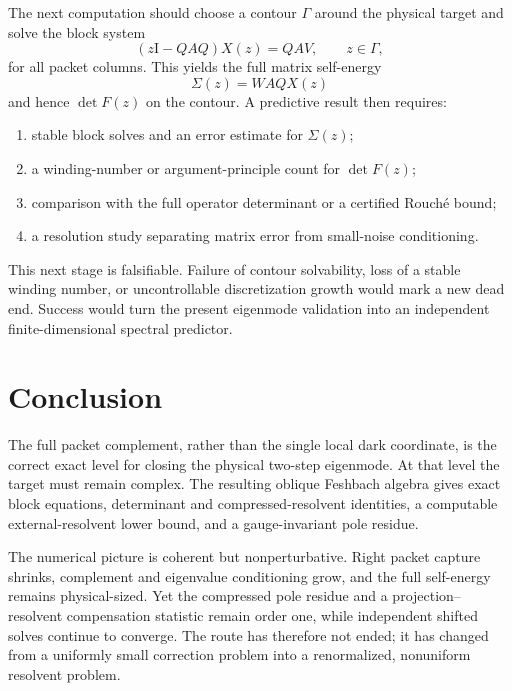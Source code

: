 \documentclass[11pt]{article}
\theoremstyle{definition}
\theoremstyle{remark}
\newcommand{\Id}{\mathrm I}
\begin{document}
The next computation should choose a contour $\Gamma$ around the physical
target and solve the block system
\begin{equation}
\label{eq:next-block-solve}
 (z\Id-QAQ)X(z)=QAV,
 \qquad z\in\Gamma,
\end{equation}
for all packet columns.  This yields the full matrix self-energy
\begin{equation}
\label{eq:next-self-energy}
 \Sigma(z)=WAQX(z)
\end{equation}
and hence $\det F(z)$ on the contour.  A predictive result then requires:
\begin{enumerate}[label=(\roman*),leftmargin=2.4em]
 \item stable block solves and an error estimate for $\Sigma(z)$;
 \item a winding-number or argument-principle count for $\det F(z)$;
 \item comparison with the full operator determinant or a certified
 Rouch\'e bound;
 \item a resolution study separating matrix error from small-noise
 conditioning.
\end{enumerate}
This next stage is falsifiable.  Failure of contour solvability, loss of a
stable winding number, or uncontrollable discretization growth would mark a
new dead end.  Success would turn the present eigenmode validation into an
independent finite-dimensional spectral predictor.

\section{Conclusion}
\label{sec:conclusion}

The full packet complement, rather than the single local dark coordinate,
is the correct exact level for closing the physical two-step eigenmode.  At
that level the target must remain complex.  The resulting oblique Feshbach
algebra gives exact block equations, determinant and compressed-resolvent
identities, a computable external-resolvent lower bound, and a
gauge-invariant pole residue.

The numerical picture is coherent but nonperturbative.  Right packet
capture shrinks, complement and eigenvalue conditioning grow, and the full
self-energy remains physical-sized.  Yet the compressed pole residue and a
projection--resolvent compensation statistic remain order one, while
independent shifted solves continue to converge.  The route has therefore
not ended; it has changed from a uniformly small correction problem into a
renormalized, nonuniform resolvent problem.
\end{document}
